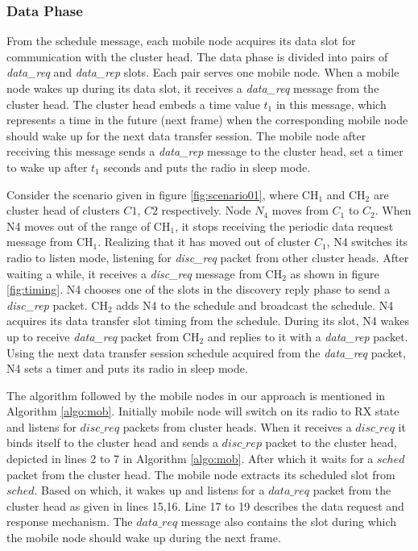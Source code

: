 \subsubsection{Data Phase}
\label{data_phase}

From the schedule message, each mobile node acquires its data slot for communication with the cluster head. The data phase is divided into pairs of \emph{data\_req} and \emph{data\_rep} slots. Each pair serves one mobile node. When a mobile node wakes up during its data slot, it receives a \emph{data\_req} message from the cluster head. The cluster head embeds a time value \emph{$t_1$} in this message, which represents a time in the future (next frame) when the corresponding mobile node should wake up for the next data transfer session. The mobile node after receiving this message sends a \emph{data\_rep} message to the cluster head, set a timer to wake up after \emph{$t_1$} seconds and puts the radio in sleep mode. 


Consider the scenario given in figure \ref{fig:scenario01}, where CH$_1$ and CH$_2$ are cluster head of clusters $C1$, $C2$ respectively. Node \emph{$N_4$} moves from $C_1$ to $C_2$. When N4 moves out of the range of CH$_1$, it stops receiving the periodic data request message from CH$_1$. Realizing that it has moved out of cluster $C_1$, N4 switches its radio to listen mode, listening for \emph{disc\_req} packet from other cluster heads.
After waiting a while, it receives a \emph{disc\_req} message from CH$_2$ as shown in figure \ref{fig:timing}. N4 chooses one of the slots in the discovery reply phase to send a \emph{disc\_rep} packet. CH$_2$ adds N4 to the schedule and broadcast the schedule. N4 acquires its data transfer slot timing from the schedule. During its slot, N4 wakes up to receive \emph{data\_req} packet from CH$_2$ and replies to it with a \emph{data\_rep} packet. Using the next data transfer session schedule acquired from the \emph{data\_req} packet, N4 sets a timer and puts its radio in sleep mode.

The algorithm followed by the mobile nodes in our approach is mentioned in Algorithm \ref{algo:mob}. Initially mobile node will switch on its radio to RX state and listens for $disc\_req$ packets from cluster heads. When it receives a $disc\_req$ it binds itself to the cluster head and sends a $disc\_rep$ packet to the cluster head, depicted in lines 2 to 7 in Algorithm \ref{algo:mob}. After which it waits for a $sched$ packet from the cluster head. The mobile node extracts its scheduled slot from $sched$. Based on which, it wakes up and listens for a $data\_req$ packet from the cluster head as given in lines 15,16. Line 17 to 19 describes the data request and response mechanism. The $data\_req$ message also contains the slot during which the mobile node should wake up during the next frame. 


